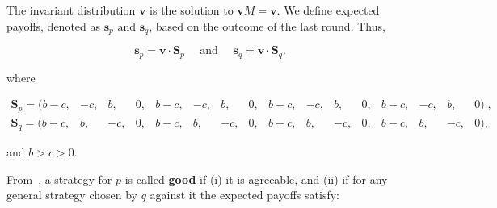 \documentclass{article}
\theoremstyle{definition}
\begin{document}

The invariant distribution \(\mathbf{v}\) is the solution to
\(\mathbf{v} M = \mathbf{v}\). We define expected payoffs,
denoted as \(\mathbf{s}_{p} \text{ and } \mathbf{s}_{q}\),
based on the outcome of the last round. Thus,

\begin{equation*}
    \mathbf{s}_{p} = \mathbf{v} \cdot \mathbf{S}_{p} \quad \text{ and } \quad \mathbf{s}_{q} = \mathbf{v} \cdot \mathbf{S}_{q}.
\end{equation*}

where

\begin{equation}\label{eq:last_round_two_bits}
  \begin{array}{*{16}{c}}
    \mathbf{S}_{p} = ( b\!-\!c , & -c , & b , & 0 , & b\!-\!c , & -c , & b , & 0 , & b\!-\!c , & -c , & b , & 0 , & b\!-\!c , & -c , & b , & 0)  \;, \\
    \mathbf{S}_{q} = ( b\!-\!c, & b, & -c, & 0, & b\!-\!c, & b, & -c, & 0, & b\!-\!c, & b, & -c, & 0, & b\!-\!c, & b, & -c, & 0),
  \end{array}
\end{equation}

and \(b > c > 0\).

From~\citep{akin:EGADS:2016}, a strategy for \(p\) is called \textbf{good} if
(i) it is agreeable, and (ii) if for any general strategy chosen by \(q\)
against it the expected payoffs satisfy:
\end{document}
